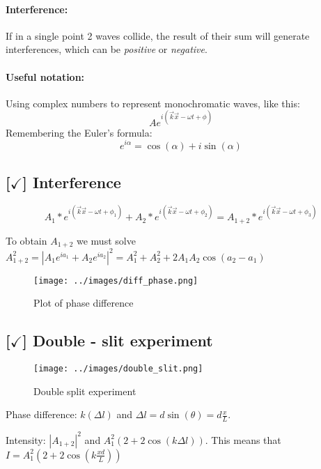 \paragraph{Interference:} If in a single point 2 waves collide, the result of their sum will generate interferences, which can be \textit{positive} or \textit{negative}.

\hrulefill

\paragraph{Useful notation:} Using complex numbers to represent monochromatic waves, like this: $$A e^{i (\vec{k} \vec{x} - \omega t + \phi)}$$ Remembering the Euler's formula: $$e^{i\alpha} = \cos(\alpha) + i \sin(\alpha)$$

\subsection{[$\checkmark$] Interference}

$$ A_1 * e^{i(\vec{k}\vec{x} - \omega t + \phi_1)} + A_2 * e^{i(\vec{k}\vec{x} - \omega t + \phi_2)} = A_{1 + 2} * e^{i(\vec{k}\vec{x} - \omega t + \phi_3)}$$

To obtain $A_{1 + 2}$ we must solve $A^{2}_{1 + 2} = | A_1 e^{ia_1} + A_2 e^{ia_2} | ^ 2 = A^2_1 + A^2_2 + 2A_1A_2 \cos(a_2 - a_1)$

\begin{figure}[ht]
    \centering
    \texttt{[image: ../images/diff\_phase.png]}
    \caption{Plot of phase difference}
    \label{fig:diff_phase}
\end{figure}

\subsection{[$\checkmark$] Double - slit experiment}

\begin{figure}[ht]
	\centering
	\texttt{[image: ../images/double\_slit.png]}
	\caption{Double split experiment}
	\label{fig:double_slit}
\end{figure}

Phase difference: $k (\Delta l)$ and $\Delta l = d \sin(\theta) = d \frac{x}{L}$.

\vspace{10pt}

Intensity: $|A_{1+2}|^2$ and $A_1^2 (2 + 2\cos(k\Delta l))$. This means that $I = A_1^2 (2 + 2\cos(k \frac{xd}{L}))$

